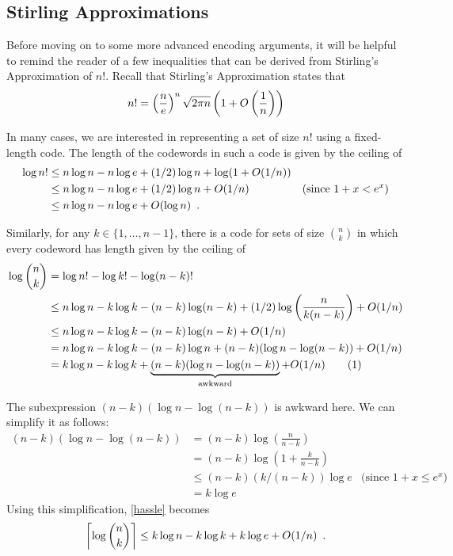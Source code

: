 \documentclass{patmorin}
\newcommand\numberthis{\addtocounter{equation}{1}\tag{\theequation}}
\begin{document}
\subsection{Stirling Approximations}

Before moving on to some more advanced encoding arguments, it will
be helpful to remind the reader of a few inequalities that can be
derived from Stirling's Approximation of $n!$.  Recall that Stirling's
Approximation states that
\begin{equation}
  n! = \left(\frac{n}{e}\right)^n\sqrt{2\pi n}\left(1+O\left(\frac{1}{n}\right)\right) 
   \eqlabel{stirling}
\end{equation}

In many cases, we are interested in representing a set of size $n!$
using a fixed-length code.  The length of the codewords in such a code
is given by the ceiling of
\begin{align}
  \log n!
      & \le n\log n - n\log e + (1/2)\log n + \log(1+O(1/n)) \notag \\
      & \le n\log n - n\log e + (1/2)\log n + O(1/n)  
             & \text{(since $1+x < e^x$)}
               \eqlabel{stirling-tight} \\
      & \le n\log n - n\log e + O(\log n)  
             \eqlabel{stirling-loose} \enspace .
\end{align}

Similarly, for any $k\in\{1,\ldots,n-1\}$, there is a code for sets of 
size $\binom{n}{k}$ in which every codeword has length given by the ceiling of
\begin{align*}
  \log \binom{n}{k}
     & = \log n! - \log k! - \log (n-k)! \\
     & \le n\log n - k\log k - (n-k)\log(n-k) + (1/2)\log\left(\frac{n}{k(n-k)}\right) + O(1/n) \\
     & \le n\log n - k\log k - (n-k)\log(n-k) + O(1/n) \\
     & = n\log n - k\log k - (n-k)\log n + (n-k)(\log n-\log(n-k)) + O(1/n) \\
     & = k\log n - k\log k + \underbrace{(n-k)(\log n-\log(n-k))}_\text{awkward}  + O(1/n) 
         \numberthis \eqlabel{hassle} \\ 
\end{align*}

The subexpression $(n-k)(\log n-\log(n-k))$ is awkward here. We can
simplify it as follows:
\begin{align*}
   (n-k)(\log n-\log(n-k))
      & = (n-k)\log \left(\frac{n}{n-k}\right) \\
      & = (n-k)\log \left(1+\frac{k}{n-k}\right) \\
      & \le (n-k)(k/(n-k))\log e & \text{(since $1+x \le e^x$)} \\
      & = k\log e 
\end{align*}
Using this simplification, \eqref{hassle} becomes
\begin{equation}
  \left\lceil\log \binom{n}{k}\right\rceil 
    \le k\log n - k\log k + k\log e + O(1/n) \eqlabel{log-n-choose-k}
     \enspace .
\end{equation} 
\end{document}

